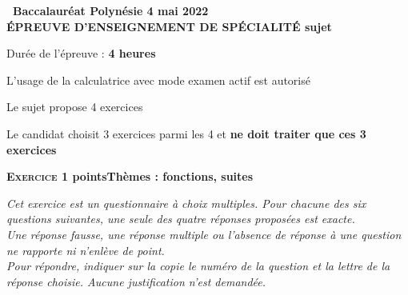 \documentclass[11pt]{article}
\begin{document}
\setlength\parindent{0mm}
\pagestyle{fancy}
\thispagestyle{empty}

\begin{center}{\Large\textbf{\decofourleft~Baccalauréat Polynésie 4 mai 2022~\decofourright\\[6pt] ÉPREUVE D'ENSEIGNEMENT DE SPÉCIALITÉ sujet }}

\bigskip

Durée de l'épreuve : \textbf{4 heures}

\medskip

L'usage de la calculatrice avec mode examen actif est autorisé

\medskip

Le sujet propose 4 exercices

Le candidat choisit 3 exercices parmi les 4 et \textbf{ne doit traiter que ces 3 exercices}
\end{center}

\bigskip

\textbf{\textsc{Exercice 1}  points\hfill Thèmes : fonctions, suites}

\medskip

\emph{Cet exercice est un questionnaire à choix multiples. Pour chacune des six questions suivantes, une seule des quatre réponses proposées est exacte.\\
Une réponse fausse, une réponse multiple ou l'absence de réponse à une question ne rapporte ni n'enlève de point.\\
Pour répondre, indiquer sur la copie le numéro de la question et la lettre de la réponse choisie. Aucune justification n'est demandée.}

\medskip
\end{document}
